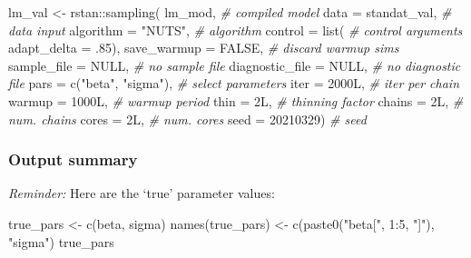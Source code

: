 \documentclass[
  11pt,
]{article}
\newenvironment{Shaded}{\begin{snugshade}}{\end{snugshade}}
\newcommand{\AttributeTok}[1]{\textcolor[rgb]{0.77,0.63,0.00}{#1}}
\newcommand{\CommentTok}[1]{\textcolor[rgb]{0.56,0.35,0.01}{\textit{#1}}}
\newcommand{\ConstantTok}[1]{\textcolor[rgb]{0.00,0.00,0.00}{#1}}
\newcommand{\DecValTok}[1]{\textcolor[rgb]{0.00,0.00,0.81}{#1}}
\newcommand{\FunctionTok}[1]{\textcolor[rgb]{0.00,0.00,0.00}{#1}}
\newcommand{\NormalTok}[1]{#1}
\newcommand{\OtherTok}[1]{\textcolor[rgb]{0.56,0.35,0.01}{#1}}
\newcommand{\SpecialCharTok}[1]{\textcolor[rgb]{0.00,0.00,0.00}{#1}}
\newcommand{\StringTok}[1]{\textcolor[rgb]{0.31,0.60,0.02}{#1}}
\begin{document}
\begin{Shaded}
\begin{Highlighting}[]
\NormalTok{lm\_val }\OtherTok{\textless{}{-}}\NormalTok{ rstan}\SpecialCharTok{::}\FunctionTok{sampling}\NormalTok{(}
\NormalTok{  lm\_mod,                     }\CommentTok{\# compiled model}
  \AttributeTok{data =}\NormalTok{ standat\_val,             }\CommentTok{\# data input}
  \AttributeTok{algorithm =} \StringTok{"NUTS"}\NormalTok{,         }\CommentTok{\# algorithm}
  \AttributeTok{control =} \FunctionTok{list}\NormalTok{(             }\CommentTok{\# control arguments}
    \AttributeTok{adapt\_delta =}\NormalTok{ .}\DecValTok{85}\NormalTok{),}
  \AttributeTok{save\_warmup =} \ConstantTok{FALSE}\NormalTok{,        }\CommentTok{\# discard warmup sims}
  \AttributeTok{sample\_file =} \ConstantTok{NULL}\NormalTok{,         }\CommentTok{\# no sample file}
  \AttributeTok{diagnostic\_file =} \ConstantTok{NULL}\NormalTok{,     }\CommentTok{\# no diagnostic file}
  \AttributeTok{pars =} \FunctionTok{c}\NormalTok{(}\StringTok{"beta"}\NormalTok{, }\StringTok{"sigma"}\NormalTok{),  }\CommentTok{\# select parameters}
  \AttributeTok{iter =}\NormalTok{ 2000L,               }\CommentTok{\# iter per chain}
  \AttributeTok{warmup =}\NormalTok{ 1000L,             }\CommentTok{\# warmup period}
  \AttributeTok{thin =}\NormalTok{ 2L,                  }\CommentTok{\# thinning factor}
  \AttributeTok{chains =}\NormalTok{ 2L,                }\CommentTok{\# num. chains}
  \AttributeTok{cores =}\NormalTok{ 2L,                 }\CommentTok{\# num. cores}
  \AttributeTok{seed =} \DecValTok{20210329}\NormalTok{)            }\CommentTok{\# seed}
\end{Highlighting}
\end{Shaded}

\hypertarget{output-summary}{%
\subsubsection{Output summary}\label{output-summary}}

\emph{Reminder:} Here are the `true' parameter values:

\begin{Shaded}
\begin{Highlighting}[]
\NormalTok{true\_pars }\OtherTok{\textless{}{-}} \FunctionTok{c}\NormalTok{(beta, sigma)}
\FunctionTok{names}\NormalTok{(true\_pars) }\OtherTok{\textless{}{-}} \FunctionTok{c}\NormalTok{(}\FunctionTok{paste0}\NormalTok{(}\StringTok{"beta["}\NormalTok{, }\DecValTok{1}\SpecialCharTok{:}\DecValTok{5}\NormalTok{, }\StringTok{"]"}\NormalTok{), }\StringTok{"sigma"}\NormalTok{)}
\NormalTok{true\_pars}
\end{Highlighting}
\end{Shaded}
\end{document}
